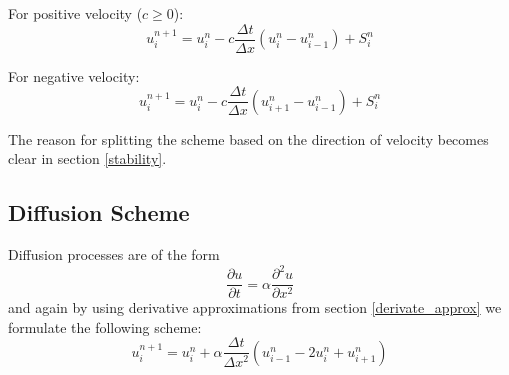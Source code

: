 \documentclass[]{article}
\begin{document}
For positive velocity ($c\geq 0$):
\begin{equation} \label{advection_scheme_upwind}
u_{i}^{n+1}=u_{i}^{n}-c\frac{\Delta t}{\Delta x} (u_{i}^{n}-u_{i-1}^{n}) + S_{i}^{n}
\end{equation}

For negative velocity:
\begin{equation} \label{advection_scheme_downwind}
u_{i}^{n+1}=u_{i}^{n}-c\frac{\Delta t}{\Delta x} (u_{i+1}^{n}-u_{i-1}^{n}) +S_{i}^{n}
\end{equation}

The reason for splitting the scheme based on the direction of velocity becomes clear in section \ref{stability}.

\subsection{Diffusion Scheme}
Diffusion processes are of the form
\begin{equation*}
\frac{\partial u}{\partial t} = \alpha \frac{\partial^2 u}{\partial x^2}
\end{equation*}
and again by using derivative approximations from section \ref{derivate_approx} we
formulate the following scheme:
\begin{equation} \label{diffusion_scheme}
u_{i}^{n+1}=u_{i}^ {n}+\alpha\frac{\Delta t}{\Delta x^{2}} (u_{i-1}^{n}-2u_{i}^{n}+u_{i+1}^{n})
\end{equation}
\end{document}
